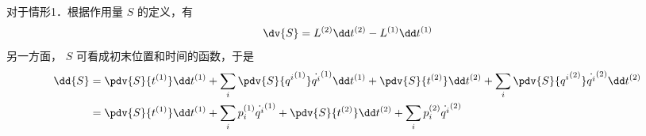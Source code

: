 对于情形1．根据作用量 $S$ 的定义，有
\begin{equation}
\dv{S}=L^{(2)}\dd t^{(2)}-L^{(1)}\dd t^{(1)}
\end{equation}
另一方面， $S$ 可看成初末位置和时间的函数，于是
\begin{equation}
\begin{aligned}
\dd{S}&=\pdv{S}{t^{(1)}}\dd t^{(1)}+\sum_i\pdv{S}{{q^i}^{(1)}}\dot {q^i}^{(1)}\dd t^{(1)}+\pdv{S}{t^{(2)}}\dd t^{(2)}+\sum_i\pdv{S}{{q^i}^{(2)}}\dot {q^i}^{(2)}\dd t^{(2)}\\
&=\pdv{S}{t^{(1)}}\dd t^{(1)}+\sum_i p_i^{(1)}\dot {q^i}^{(1)}+\pdv{S}{t^{(2)}}\dd t^{(2)}+\sum_i p_i^{(2)}\dot {q^i}^{(2)}
\end{aligned}
\end{equation}

